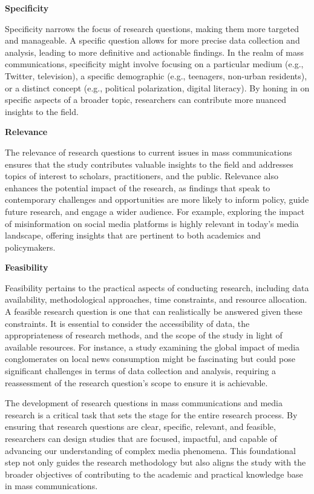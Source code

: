 \documentclass[
]{book}
\begin{document}
\textbf{Specificity}

Specificity narrows the focus of research questions, making them more targeted and manageable. A specific question allows for more precise data collection and analysis, leading to more definitive and actionable findings. In the realm of mass communications, specificity might involve focusing on a particular medium (e.g., Twitter, television), a specific demographic (e.g., teenagers, non-urban residents), or a distinct concept (e.g., political polarization, digital literacy). By honing in on specific aspects of a broader topic, researchers can contribute more nuanced insights to the field.

\textbf{Relevance}

The relevance of research questions to current issues in mass communications ensures that the study contributes valuable insights to the field and addresses topics of interest to scholars, practitioners, and the public. Relevance also enhances the potential impact of the research, as findings that speak to contemporary challenges and opportunities are more likely to inform policy, guide future research, and engage a wider audience. For example, exploring the impact of misinformation on social media platforms is highly relevant in today's media landscape, offering insights that are pertinent to both academics and policymakers.

\textbf{Feasibility}

Feasibility pertains to the practical aspects of conducting research, including data availability, methodological approaches, time constraints, and resource allocation. A feasible research question is one that can realistically be answered given these constraints. It is essential to consider the accessibility of data, the appropriateness of research methods, and the scope of the study in light of available resources. For instance, a study examining the global impact of media conglomerates on local news consumption might be fascinating but could pose significant challenges in terms of data collection and analysis, requiring a reassessment of the research question's scope to ensure it is achievable.

The development of research questions in mass communications and media research is a critical task that sets the stage for the entire research process. By ensuring that research questions are clear, specific, relevant, and feasible, researchers can design studies that are focused, impactful, and capable of advancing our understanding of complex media phenomena. This foundational step not only guides the research methodology but also aligns the study with the broader objectives of contributing to the academic and practical knowledge base in mass communications.
\end{document}

